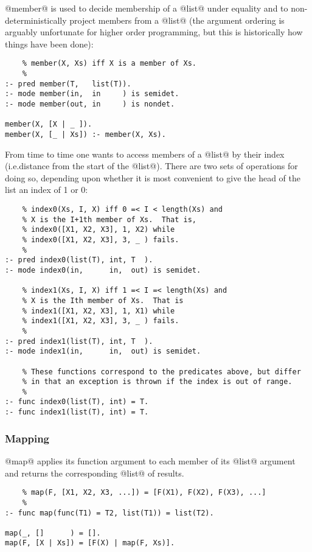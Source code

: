\documentclass[a4paper,11pt,notitlepage,onecolumn]{article}
\makeatletter
\newcommand{\ie}%
{i.e.\@ }
\makeatother
\begin{document}
@member@ is used to decide membership of a @list@ under equality and to
non-deterministically project members from a @list@ (the argument ordering
is arguably unfortunate for higher order programming, but this is
historically how things have been done):
\begin{verbatim}
    % member(X, Xs) iff X is a member of Xs.
    %
:- pred member(T,   list(T)).
:- mode member(in,  in     ) is semidet.
:- mode member(out, in     ) is nondet.

member(X, [X | _ ]).
member(X, [_ | Xs]) :- member(X, Xs).
\end{verbatim}
From time to time one wants to access members of a @list@ by their index
(\ie distance from the start of the @list@).  There are two sets of
operations for doing so, depending upon whether it is most convenient to
give the head of the list an index of 1 or 0:
\begin{verbatim}
    % index0(Xs, I, X) iff 0 =< I < length(Xs) and
    % X is the I+1th member of Xs.  That is,
    % index0([X1, X2, X3], 1, X2) while
    % index0([X1, X2, X3], 3, _ ) fails.
    %
:- pred index0(list(T), int, T  ).
:- mode index0(in,      in,  out) is semidet.

    % index1(Xs, I, X) iff 1 =< I =< length(Xs) and
    % X is the Ith member of Xs.  That is
    % index1([X1, X2, X3], 1, X1) while
    % index1([X1, X2, X3], 3, _ ) fails.
    %
:- pred index1(list(T), int, T  ).
:- mode index1(in,      in,  out) is semidet.

    % These functions correspond to the predicates above, but differ
    % in that an exception is thrown if the index is out of range.
    %
:- func index0(list(T), int) = T.
:- func index1(list(T), int) = T.
\end{verbatim}

\subsubsection{Mapping}

@map@ applies its function argument to each member of its @list@ argument
and returns the corresponding @list@ of results.
\begin{verbatim}
    % map(F, [X1, X2, X3, ...]) = [F(X1), F(X2), F(X3), ...]
    %
:- func map(func(T1) = T2, list(T1)) = list(T2).

map(_, []      ) = [].
map(F, [X | Xs]) = [F(X) | map(F, Xs)].
\end{verbatim}
\end{document}
